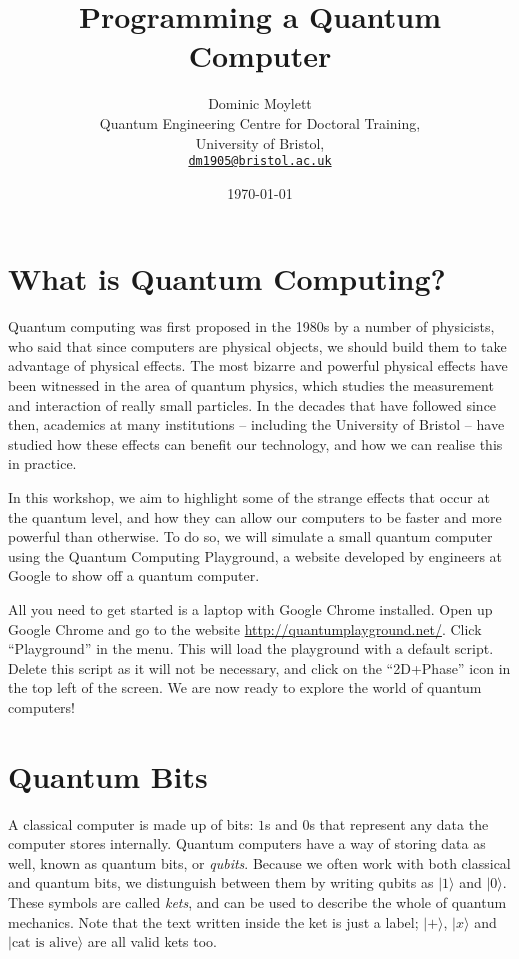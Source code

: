 \documentclass[twocolumn]{article}
\begin{document}
\lstset{style=Style1}

\title{Programming a Quantum Computer} 
\author{Dominic Moylett\\
        	Quantum Engineering Centre for Doctoral Training,\\
		University of Bristol,\\
		\texttt{\href{mailto:dm1905@bristol.ac.uk}{dm1905@bristol.ac.uk}} 
		}
\date{\today} 
\maketitle

\section{What is Quantum Computing?}

Quantum computing was first proposed in the 1980s by a number of physicists, who said that since computers are physical objects, we should build them to take advantage of physical effects. The most bizarre and powerful physical effects have been witnessed in the area of quantum physics, which studies the measurement and interaction of really small particles. In the decades that have followed since then, academics at many institutions -- including the University of Bristol -- have studied how these effects can benefit our technology, and how we can realise this in practice.

In this workshop, we aim to highlight some of the strange effects that occur at the quantum level, and how they can allow our computers to be faster and more powerful than otherwise. To do so, we will simulate a small quantum computer using the Quantum Computing Playground, a website developed by engineers at Google to show off a quantum computer.

All you need to get started is a laptop with Google Chrome installed. Open up Google Chrome and go to the website \url{http://quantumplayground.net/}. Click ``Playground'' in the menu. This will load the playground with a default script. Delete this script as it will not be necessary, and click on the ``2D+Phase'' icon in the top left of the screen. We are now ready to explore the world of quantum computers!

\section{Quantum Bits}

A classical computer is made up of bits: $1$s and $0$s that represent any data the computer stores internally. Quantum computers have a way of storing data as well, known as quantum bits, or {\em qubits}. Because we often work with both classical and quantum bits, we distunguish between them by writing qubits as $|1\rangle$ and $|0\rangle$. These symbols are called {\em kets}, and can be used to describe the whole of quantum mechanics. Note that the text written inside the ket is just a label; $|+\rangle$, $|x\rangle$ and $| \text{cat is alive} \rangle$ are all valid kets too.
\end{document}
